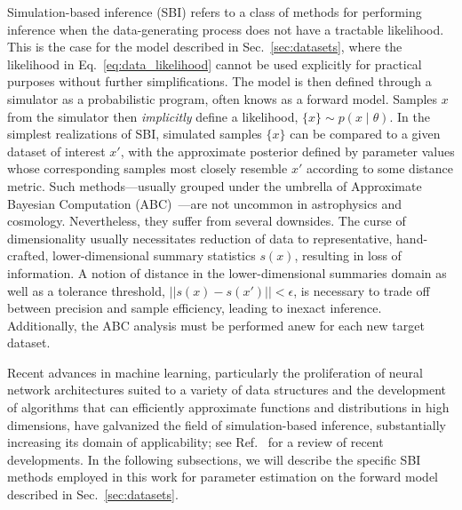 \documentclass[prd,aps,10pt,nofootinbib,twocolumn,superscriptaddress,preprintnumbers,balancelastpage,longbibliography]{revtex4-1}
\begin{document}
Simulation-based inference (SBI) refers to a class of methods for performing inference when the data-generating process does not have a tractable likelihood. This is the case for the model described in Sec.~\ref{sec:datasets}, where the likelihood in Eq.~\eqref{eq:data_likelihood} cannot be used explicitly for practical purposes without further simplifications. The model is then defined through a simulator as a probabilistic program, often knows as a forward model. Samples ${x}$ from the simulator then \emph{implicitly} define a likelihood, $\{x\}\sim p(x\mid\theta)$. In the simplest realizations of SBI, simulated samples $\{x\}$ can be compared to a given dataset of interest $x'$, with the approximate posterior defined by parameter values whose corresponding samples most closely resemble $x'$ according to some distance metric. Such methods---usually grouped under the umbrella of Approximate Bayesian Computation (ABC)~\cite{10.1214/aos/1176346785}---are not uncommon in astrophysics and cosmology. Nevertheless, they suffer from several downsides. The curse of dimensionality usually necessitates reduction of data to representative, hand-crafted, lower-dimensional summary statistics $s(x)$, resulting in loss of information. A notion of distance in the lower-dimensional summaries domain as well as a tolerance threshold, $||s(x) - s(x')|| < \epsilon$, is necessary to trade off between precision and sample efficiency, leading to inexact inference. Additionally, the ABC analysis must be performed anew for each new target dataset.

Recent advances in machine learning, particularly the proliferation of neural network architectures suited to a variety of data structures and the development of algorithms that can efficiently approximate functions and distributions in high dimensions, have galvanized the field of simulation-based inference, substantially increasing its domain of applicability; see Ref.~\cite{cranmer2020frontier} for a review of recent developments. In the following subsections, we will describe the specific SBI methods employed in this work for parameter estimation on the forward model described in Sec.~\ref{sec:datasets}.

\end{document}
